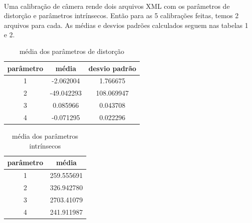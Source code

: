 \documentclass{article}
\begin{document}
			\paragraph{}
			Uma calibração de câmera rende dois arquivos XML com os parâmetros de distorção e parâmetros intrínsecos. Então para as 5 calibrações feitas, temos 2 arquivos para cada. As médias e desvios padrões calculados seguem nas tabelas 1 e 2.
			\begin{table}
				\caption{média dos parâmetros de distorção}
				\centering
				\begin{tabular}{c c c}
					parâmetro & média & desvio padrão\\
					\hline\hline
					1 & -2.062004 & 1.766675\\
					2 & -49.042293 & 108.069947\\
					3 & 0.085966 & 0.043708\\
					4 & -0.071295 & 0.022296\\
				\end{tabular}
			\end{table}
			\begin{table}
				\caption{média dos parâmetros intrínsecos}
				\centering
				\begin{tabular}{c c}
					parâmetro & média \\
					\hline\hline
					1 & 259.555691\\
					2 & 326.942780\\
					3 & 2703.41079\\
					4 & 241.911987\\
				\end{tabular}
			\end{table}
\end{document}
